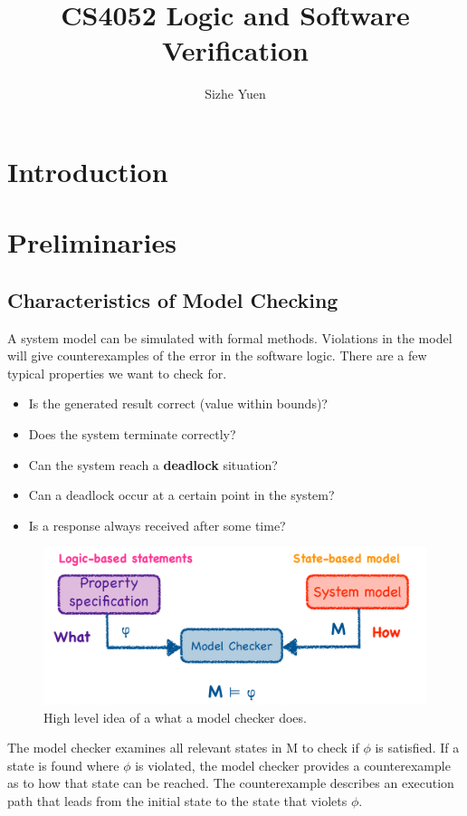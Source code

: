 \documentclass[11pt]{article}
\author{Sizhe Yuen}
\title{CS4052 Logic and Software Verification}
\begin{document}
\maketitle
\tableofcontents

\newcommand{\n}[0]{\\[\baselineskip]}

\section{Introduction}


\section{Preliminaries}

\subsection{Characteristics of Model Checking}
A system model can be simulated with formal methods. Violations in the model will give counterexamples of the error in the software logic. There are a few typical properties we want to check for.
\begin{itemize}
\item Is the generated result correct (value within bounds)?
\item Does the system terminate correctly?
\item Can the system reach a \textbf{deadlock} situation?
\item Can a deadlock occur at a certain point in the system?
\item Is a response always received after some time?
\end{itemize}

\begin{figure}[H]
\centering
\includegraphics[width=1\textwidth, keepaspectratio]{imgs/model-checker-logic.png}
\caption{High level idea of a what a model checker does.}
\end{figure}
\noindent
The model checker examines all relevant states in M to check if $\phi$ is satisfied. If a state is found where $\phi$ is violated, the model checker provides a counterexample as to how that state can be reached. The counterexample describes an execution path that leads from the initial state to the state that violets $\phi$. 
\n
\end{document}
